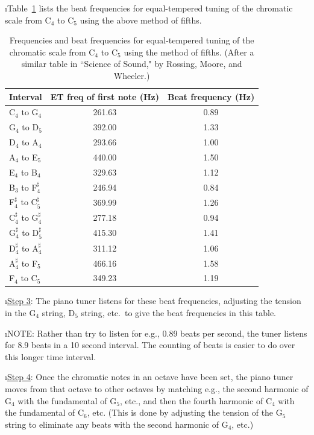 \i Table~\ref{t:beatfreqsET} lists the beat frequencies 
for equal-tempered tuning of the chromatic scale from 
C${}_4$ to C${}_5$ using the above method of fifths.
%
\begin{table}[htbp]
\begin{center}
\begin{tabular}{|l|c|c|}
\hline
Interval & ET freq of first note (Hz) & Beat frequency (Hz) \\
\hline
C${}_4$ to G${}_4$ & 261.63 & 0.89 \\
G${}_4$ to D${}_5$ & 392.00 & 1.33 \\
D${}_4$ to A${}_4$ & 293.66 & 1.00 \\
A${}_4$ to E${}_5$ & 440.00 & 1.50 \\
E${}_4$ to B${}_4$ & 329.63 & 1.12 \\
B${}_3$ to F${}^\sharp_4$ & 246.94 & 0.84 \\
F${}^\sharp_4$ to C${}^\sharp_5$ & 369.99 & 1.26 \\
C${}^\sharp_4$ to G${}^\sharp_4$ & 277.18 & 0.94 \\
G${}^\sharp_4$ to D${}^\sharp_5$ & 415.30 & 1.41 \\
D${}^\sharp_4$ to A${}^\sharp_4$ & 311.12 & 1.06 \\
A${}^\sharp_4$ to F${}_5$ & 466.16 & 1.58 \\
F${}_4$ to C${}_5$ & 349.23 & 1.19 \\
\hline
\end{tabular}
\caption{Frequencies and beat frequencies 
for equal-tempered tuning of the chromatic scale from 
C${}_4$ to C${}_5$ using the method of fifths.
(After a similar table in ``Science of Sound," by
Rossing, Moore, and Wheeler.)}
\label{t:beatfreqsET}
\end{center}
\end{table}

\i \underline{Step 3}:
The piano tuner listens for these beat frequencies,
adjusting the tension in the G${}_4$ string, 
D${}_5$ string, etc.\ 
to give the beat frequencies in this table.

\i NOTE: Rather than try
to listen for e.g., 0.89 beats per second, the tuner 
listens for 8.9 beats in a 10 second interval.
The counting of beats is easier to do over this longer 
time interval.

\i \underline{Step 4}:
Once the chromatic notes in an octave have been
set, the piano tuner moves from that octave to other
octaves by matching e.g., the second harmonic of G${}_4$ 
with the fundamental of G${}_5$, etc., and 
then the fourth harmonic of C${}_4$ with the 
fundamental of C${}_6$, etc.
(This is done by adjusting the tension of the G${}_5$ 
string to eliminate any beats with the second harmonic 
of G${}_4$, etc.)

